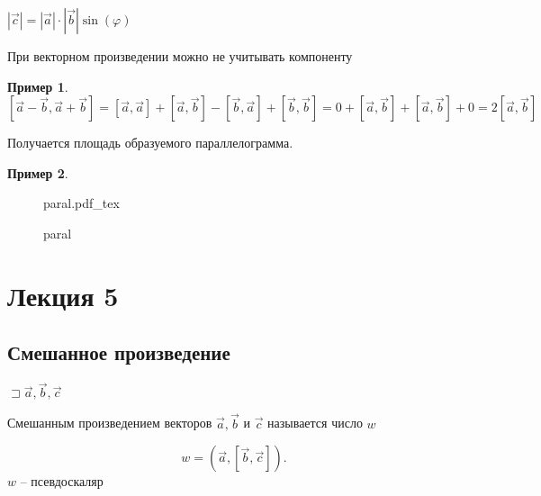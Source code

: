\documentclass{book}
\theoremstyle{definition}
\newtheorem*{example}{Пример}
\newcommand{\incfig}[1]{%
    \def\svgwidth{\columnwidth}
    {#1.pdf_tex}
}
\begin{document}
 $\left| \vec c \right| = \left| \vec a \right| \cdot \left| \vec b \right|\sin(\varphi)  $

 При векторном произведении можно не учитывать компоненту 

 \begin{example}
     $[\vec a-\vec b, \vec a + \vec b] = [\vec a, \vec a]+[\vec a, \vec b] - [\vec b, \vec a] + [\vec b, \vec b] = 0 + [\vec a, \vec b] + [\vec a, \vec b] + 0  = 2[\vec a, \vec b]$

     Получается площадь образуемого параллелограмма.
 \end{example}

\begin{example}
\begin{figure}[ht]
    \centering
    \incfig{paral}
    \caption{paral}
    \label{fig:paral}
\end{figure}
\end{example}

\section{Лекция 5}
\subsection{Смешанное произведение}

\begin{definition}
    $\sqsupset \vec a, \vec b, \vec c$

    Смешанным произведением векторов $\vec a, \vec b$ и  $\vec c$ называется число  $w$

     \[
         w = (\vec a, [\vec b, \vec c])
     .\] 
    $w$ -- псевдоскаляр
\end{definition}
\end{document}
